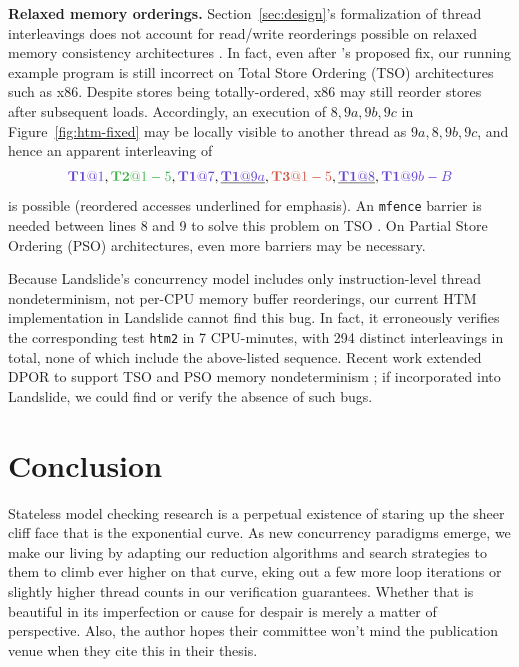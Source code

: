 \documentclass[10pt]{sigplanconf}
\begin{document}
{\bf Relaxed memory orderings.}
Section~\ref{sec:design}'s formalization of thread interleavings does not account for read/write reorderings
possible on relaxed memory consistency architectures \cite{memory-consistency-models}.
In fact,
even after \cite{htm-mario}'s proposed fix,
our running example program is still incorrect on Total Store Ordering (TSO) architectures such as x86.
Despite stores being totally-ordered, x86 may still reorder stores after subsequent loads.
Accordingly, an execution of $8,9a,9b,9c$ in Figure~\ref{fig:htm-fixed}
may be locally visible to another thread as $9a,8,9b,9c$,
and hence an apparent interleaving of
\[
	\tiat{1},\tjat{1-5},\tiat{7},\underline{\tiat{9a}},\tkat{1-5},\underline{\tiat{8}},\tiat{9b-B}
\]
is possible
(reordered accesses underlined for emphasis).
An {\tt mfence} barrier is needed between lines 8 and 9 to solve this problem on TSO \cite{tsx-need-barrier}.
On Partial Store Ordering (PSO) architectures, even more barriers may be necessary.

Because Landslide's concurrency model includes only instruction-level thread nondeterminism,
not per-CPU memory buffer reorderings,
our current HTM implementation in Landslide cannot find this bug.
In fact, it erroneously verifies the corresponding test {\tt htm2} in 7 CPU-minutes,
with 294 distinct interleavings in total,
none of which include the above-listed sequence.
Recent work extended DPOR to support TSO and PSO memory nondeterminism \cite{tsopso};
if incorporated into Landslide, we could find or verify the absence of such bugs.


\section{Conclusion}

Stateless model checking research is a perpetual existence of staring up the sheer cliff face that is the exponential curve.
As new concurrency paradigms emerge,
we make our living by adapting our reduction algorithms and search strategies to them to climb ever higher on that curve,
eking out a few more loop iterations or slightly higher thread counts in our verification guarantees.
Whether that is beautiful in its imperfection or cause for despair is merely a matter of perspective.
Also, the author hopes their committee won't mind the publication venue when they cite this in their thesis.




\end{document}
